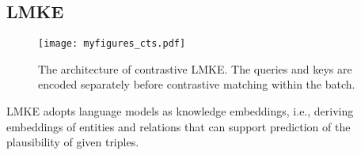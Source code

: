 \documentclass{article}
\begin{document}
\subsection{LMKE}

\begin{figure*}[htbp]
  \centering
   \texttt{[image: myfigures\_cts.pdf]}


  \caption{The architecture of contrastive LMKE. The queries and keys are encoded separately before contrastive matching within the batch. 
}
  \label{fig:link_prediction_contrastive}

\end{figure*}






LMKE adopts language models as knowledge embeddings, i.e., deriving embeddings of entities and relations that can support prediction of the plausibility of given triples. 
\end{document}
